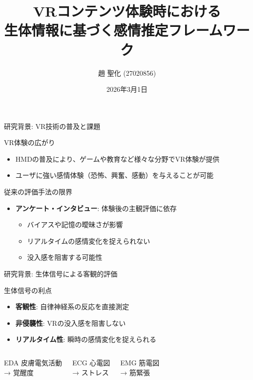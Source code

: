 \documentclass[aspectratio=169,10pt]{beamer}
\title{VRコンテンツ体験時における\\生体情報に基づく感情推定フレームワーク}
\author{趙 聖化 (27020856)}
\institute{関西学院大学 工学部 知能・機械工学課程\\指導教員: 井村 誠孝 教授}
\date{2026年3月1日}
\begin{document}
\begin{frame}
\titlepage
\end{frame}

\begin{frame}{研究背景: VR技術の普及と課題}
\begin{block}{VR体験の広がり}
\begin{itemize}
\item HMDの普及により、ゲームや教育など様々な分野でVR体験が提供
\item ユーザに強い感情体験（恐怖、興奮、感動）を与えることが可能
\end{itemize}
\end{block}

\begin{alertblock}{従来の評価手法の限界}
\begin{itemize}
\item \textbf{アンケート・インタビュー}: 体験後の主観評価に依存
\begin{itemize}
\item バイアスや記憶の曖昧さが影響
\item リアルタイムの感情変化を捉えられない
\item 没入感を阻害する可能性
\end{itemize}
\end{itemize}
\end{alertblock}
\end{frame}

\begin{frame}{研究背景: 生体信号による客観的評価}
\begin{block}{生体信号の利点}
\begin{itemize}
\item \textbf{客観性}: 自律神経系の反応を直接測定
\item \textbf{非侵襲性}: VRの没入感を阻害しない
\item \textbf{リアルタイム性}: 瞬時の感情変化を捉えられる
\end{itemize}
\end{block}

\begin{columns}[T]
\begin{block}{EDA}
皮膚電気活動\\
→ 覚醒度
\end{block}

\begin{block}{ECG}
心電図\\
→ ストレス
\end{block}

\begin{block}{EMG}
筋電図\\
→ 筋緊張
\end{block}
\end{columns}
\end{frame}
\end{document}
